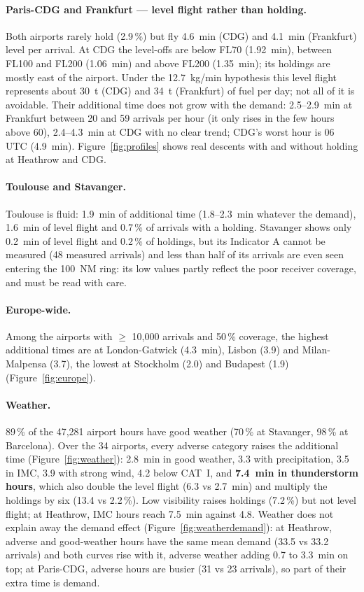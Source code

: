 \documentclass[11pt,a4paper]{article}
\begin{document}
\paragraph{Paris-CDG and Frankfurt --- level flight rather than holding.}
Both airports rarely hold (2.9\,\%) but fly 4.6~min (CDG) and 4.1~min (Frankfurt) level per arrival. At CDG the level-offs are below FL70 (1.92~min), between FL100 and FL200 (1.06~min) and above FL200 (1.35~min); its holdings are mostly east of the airport. Under the 12.7~kg/min hypothesis this level flight represents about 30~t (CDG) and 34~t (Frankfurt) of fuel per day; not all of it is avoidable. Their additional time does not grow with the demand: 2.5--2.9~min at Frankfurt between 20 and 59 arrivals per hour (it only rises in the few hours above 60), 2.4--4.3~min at CDG with no clear trend; CDG's worst hour is 06 UTC (4.9~min). Figure~\ref{fig:profiles} shows real descents with and without holding at Heathrow and CDG.

\paragraph{Toulouse and Stavanger.}
Toulouse is fluid: 1.9~min of additional time (1.8--2.3~min whatever the demand), 1.6~min of level flight and 0.7\,\% of arrivals with a holding. Stavanger shows only 0.2~min of level flight and 0.2\,\% of holdings, but its Indicator A cannot be measured (48 measured arrivals) and less than half of its arrivals are even seen entering the 100~NM ring: its low values partly reflect the poor receiver coverage, and must be read with care.

\paragraph{Europe-wide.}
Among the airports with $\ge$ 10,000 arrivals and 50\,\% coverage, the highest additional times are at London-Gatwick (4.3~min), Lisbon (3.9) and Milan-Malpensa (3.7), the lowest at Stockholm (2.0) and Budapest (1.9) (Figure~\ref{fig:europe}).

\paragraph{Weather.}
89\,\% of the 47,281 airport hours have good weather (70\,\% at Stavanger, 98\,\% at Barcelona). Over the 34 airports, every adverse category raises the additional time (Figure~\ref{fig:weather}): 2.8~min in good weather, 3.3 with precipitation, 3.5 in IMC, 3.9 with strong wind, 4.2 below CAT~I, and \textbf{7.4~min in thunderstorm hours}, which also double the level flight (6.3 vs 2.7~min) and multiply the holdings by six (13.4 vs 2.2\,\%). Low visibility raises holdings (7.2\,\%) but not level flight; at Heathrow, IMC hours reach 7.5~min against 4.8. Weather does not explain away the demand effect (Figure~\ref{fig:weatherdemand}): at Heathrow, adverse and good-weather hours have the same mean demand (33.5 vs 33.2 arrivals) and both curves rise with it, adverse weather adding 0.7 to 3.3~min on top; at Paris-CDG, adverse hours are busier (31 vs 23 arrivals), so part of their extra time is demand.
\end{document}
